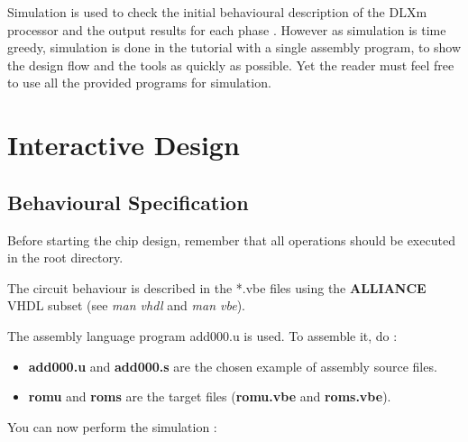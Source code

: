 Simulation is used to check the initial behavioural description of the DLXm processor and the output results for each phase . 
 However as simulation is time greedy, simulation is done in the tutorial with a single assembly program, to show the design flow and the tools as quickly as possible.
Yet the reader must feel free to use all the provided programs for simulation.


\section{Interactive Design}

	\subsection{Behavioural Specification}

Before starting the chip design, remember that all operations should be executed in the root directory.


The circuit behaviour is described in the *.vbe files using the {\bf ALLIANCE} VHDL subset (see {\it man vhdl} and {\it man vbe}). 

The assembly language program add000.u is used. To assemble it, do :


\begin{itemize}
\item
{\bf add000.u} and {\bf add000.s} are the chosen example of assembly
source files.
\item
{\bf romu} and {\bf roms} are the target files ({\bf romu.vbe} and
{\bf roms.vbe}).
\end{itemize}

You can now perform the simulation :


